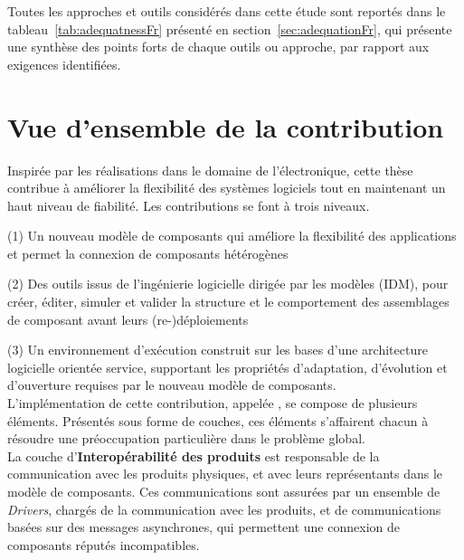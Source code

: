 Toutes les approches et outils considérés dans cette étude sont reportés dans le tableau~\ref{tab:adequatnessFr} présenté en section~\ref{sec:adequationFr}, qui présente une synthèse des points forts de chaque outils ou approche, par rapport aux exigences identifiées.


\section{Vue d'ensemble de la contribution}

Inspirée par les réalisations dans le domaine de l'électronique, cette thèse contribue à améliorer la flexibilité des systèmes logiciels tout en maintenant un haut niveau de fiabilité. Les contributions se font à trois niveaux.

\par (1) Un nouveau modèle de composants qui améliore la flexibilité des applications et permet la connexion de composants hétérogènes
\par (2) Des outils issus de l'ingénierie logicielle dirigée par les modèles (IDM), pour créer, éditer, simuler et valider la structure et le comportement des assemblages de composant avant leurs (re-)déploiements
\par (3) Un environnement d'exécution construit sur les bases d'une architecture logicielle orientée service, supportant les propriétés d'adaptation, d'évolution et d'ouverture requises par le nouveau modèle de composants.\\

L'implémentation de cette contribution, appelée \enti{}, se compose de plusieurs éléments. Présentés sous forme de couches, ces éléments s'affairent chacun à résoudre une préoccupation particulière dans le problème global.\\

La couche d'{\bf Interopérabilité des produits} est responsable de la communication avec les produits physiques, et avec leurs représentants dans le modèle de composants. Ces communications sont assurées par un ensemble de {\it Drivers}, chargés de la communication avec les produits, et de communications basées sur des messages asynchrones, qui permettent une connexion de composants réputés incompatibles.\\

